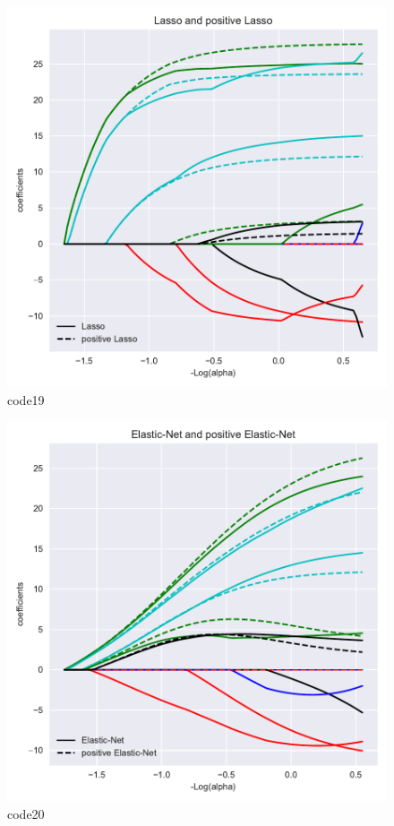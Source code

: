 \begin{figure}[htbp]
	\centering
	\includegraphics[width=14cm]{codeimage/code19}
	\caption{code19}
	\label{code19}
\end{figure}

\begin{figure}[htbp]
	\centering
	\includegraphics[width=14cm]{codeimage/code20}
	\caption{code20}
	\label{code20}
\end{figure}

